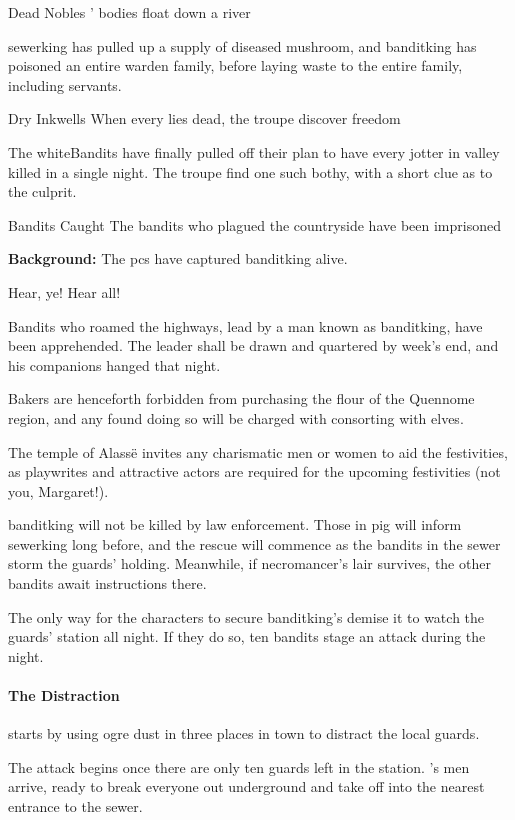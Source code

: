 {Dead Nobles}%
{' bodies float down a river}%

\Gls{sewerking} has pulled up a supply of diseased mushroom, and \gls{banditking} has poisoned an entire \gls{warden} family, before laying waste to the entire family, including servants.

{Dry Inkwells}%
{When every  lies dead, the troupe discover freedom}%

The \gls{whiteBandits} have finally pulled off their plan to have every \gls{jotter} in \gls{valley} killed in a single night.
The troupe find one such \gls{bothy}, with a short clue as to the culprit.

{Bandits Caught}%
{The bandits who plagued the countryside have been imprisoned}%

\textbf{Background:}
The \glspl{pc} have captured \gls{banditking} alive.

\begin{boxtext}

  Hear, ye!  Hear all!

  Bandits who roamed the highways, lead by a man known as \gls{banditking}, have been apprehended.  The leader shall be drawn and quartered by week's end, and his companions hanged that night.

  Bakers are henceforth forbidden from purchasing the flour of the Quennome region, and any found doing so will be charged with consorting with elves.

  The temple of Alass\"e invites any charismatic men or women to aid the festivities, as playwrites and attractive actors are required for the upcoming festivities (not you, Margaret!).

\end{boxtext}

\Gls{banditking} will not be killed by law enforcement.
Those in \gls{pig} will inform \gls{sewerking} long before, and the rescue will commence as the bandits in the sewer storm the guards' holding.
Meanwhile, if \gls{necromancer}'s lair survives, the other bandits await instructions there.


The only way for the characters to secure \gls{banditking}'s demise it to watch the guards' station all night.
If they do so, ten bandits stage an attack during the night.

\paragraph{The Distraction} starts by using ogre dust in three places in town to distract the local guards.

The attack begins once there are only ten guards left in the station.
's men arrive, ready to break everyone out underground and take off into the nearest entrance to the sewer.

\stopcontents[sq]


